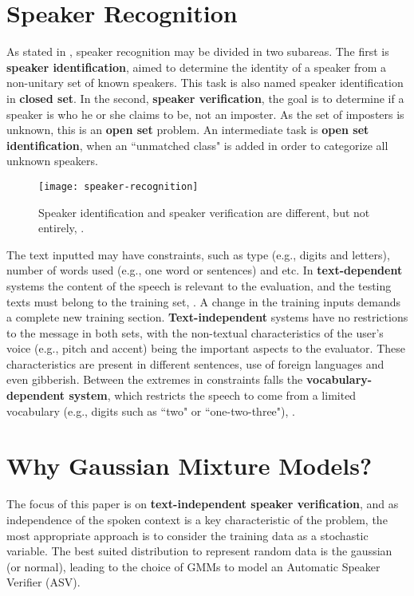 \section{Speaker Recognition}
\label{sec:speaker-recognition}

As stated in , speaker recognition may be divided in two subareas. The first is \textbf{speaker identification}, aimed to determine the identity of a speaker from a non-unitary set of known speakers. This task is also named speaker identification in \textbf{closed set}. In the second, \textbf{speaker verification}, the goal is to determine if a speaker is who he or she claims to be, not an imposter. As the set of imposters is unknown, this is an \textbf{open set} problem. An intermediate task is \textbf{open set identification}, when an ``unmatched class" is added in order to categorize all unknown speakers.

\begin{figure}[ht]
    \centering
    \texttt{[image: speaker-recognition]}
    \caption{Speaker identification and speaker verification are different, but not entirely, .}
    \label{fig:speaker-recognition}
\end{figure}

The text inputted may have constraints, such as type (e.g., digits and letters), number of words used (e.g., one word or sentences) and etc. In \textbf{text-dependent} systems the content of the speech is relevant to the evaluation, and the testing texts must belong to the training set, . A change in the training inputs demands a complete new training section. \textbf{Text-independent} systems have no restrictions to the message in both sets, with the non-textual characteristics of the user's voice (e.g., pitch and accent) being the important aspects to the evaluator. These characteristics are present in different sentences, use of foreign languages and even gibberish. Between the extremes in constraints falls the \textbf{vocabulary-dependent system}, which restricts the speech to come from a limited vocabulary (e.g., digits such as ``two" or ``one-two-three"), .

\section{Why Gaussian Mixture Models?}

The focus of this paper is on \textbf{text-independent speaker verification}, and as independence of the spoken context is a key characteristic of the problem, the most appropriate approach is to consider the training data as a stochastic variable. The best suited distribution to represent random data is the gaussian (or normal), leading to the choice of GMMs to model an Automatic Speaker Verifier (ASV).

